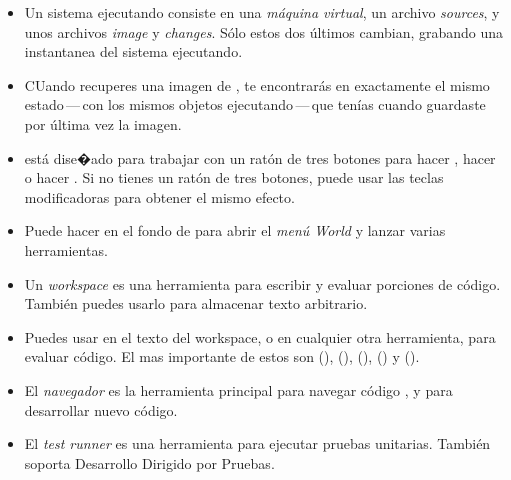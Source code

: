 \documentclass[a4paper,10pt,twoside]{book}
\begin{document}
\begin{itemize}
  \item Un sistema \pharo ejecutando consiste en una \emph{m\'aquina virtual}, un archivo \emph{sources}, y unos archivos \emph{image} y \emph{changes}. S\'olo estos dos \'ultimos cambian, grabando una instantanea del sistema ejecutando.
  \item CUando recuperes una imagen de \pharo, te encontrar\'as en exactamente el mismo estado\,---\,con los mismos objetos ejecutando\,---\,que ten\'ias cuando guardaste por \'ultima vez la imagen.
  \item \pharo est\'a dise�ado para trabajar con un rat\'on de tres botones para hacer \click, hacer \actclick o hacer \metaclick. Si no tienes un rat\'on de tres botones, puede usar las teclas modificadoras para obtener el mismo efecto.
  \item Puede hacer \click en el fondo de \pharo para abrir el \emph{men\'u World} y lanzar varias herramientas.
  \item Un \emph{workspace} es una herramienta para escribir y evaluar porciones de c\'odigo. Tambi\'en puedes usarlo para almacenar texto arbitrario.
  \item Puedes usar  en el texto del workspace, o en cualquier otra herramienta, para evaluar c\'odigo. El mas importante de estos son  (),  (),  (),  () y  ().
  \item El \emph{navegador} es la herramienta principal para navegar c\'odigo \pharo, y para desarrollar nuevo c\'odigo.
  \item El \emph{test runner} es una herramienta para ejecutar pruebas unitarias. Tambi\'en soporta Desarrollo Dirigido por Pruebas.
\end{itemize}

\ifx\wholebook\relax\else 
   
   
\end{document}
